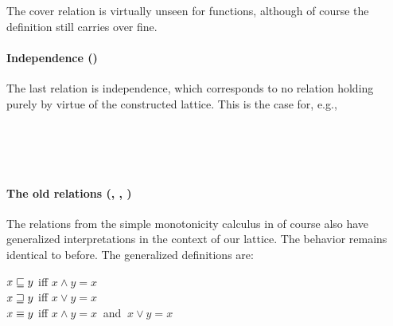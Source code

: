 The cover relation is virtually unseen for functions, although of course the definition
  still carries over fine.



\paragraph{Independence (\independent)}
The last relation is independence, which corresponds to no relation holding purely
  by virtue of the constructed lattice.
This is the case for, e.g.,
\begin{lquote}
 \independent\  \\
 \independent\  \\
 \independent\  \\
\end{lquote}



\paragraph{The old relations (\forward, \reverse, \equivalent)}
The relations from the simple monotonicity calculus in 
  of course also have generalized interpretations in the context of our lattice.
The behavior remains identical to before.
The generalized definitions are:
\begin{lquote}
$x \sqsubseteq y$ iff $x \land y = x$ \\
$x \sqsupseteq y$ iff $x \lor y = x$ \\
$x \equiv y$ iff $x \land y = x~$ and $~x \lor y = x$ \\
\end{lquote}




%
%


